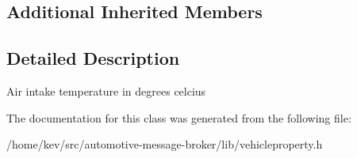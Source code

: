 \subsection*{Additional Inherited Members}


\subsection{Detailed Description}
Air intake temperature in degrees celcius 

The documentation for this class was generated from the following file\+:\begin{DoxyCompactItemize}
\item 
/home/kev/src/automotive-\/message-\/broker/lib/vehicleproperty.\+h\end{DoxyCompactItemize}
